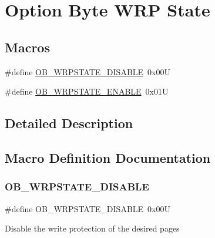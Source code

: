 \hypertarget{group___f_l_a_s_h_ex___o_b___w_r_p___state}{}\section{Option Byte W\+RP State}
\label{group___f_l_a_s_h_ex___o_b___w_r_p___state}
\subsection*{Macros}
\begin{DoxyCompactItemize}
\item 
\#define \hyperlink{group___f_l_a_s_h_ex___o_b___w_r_p___state_gaa34eb6205fe554f65a311ee974d5a4ab}{O\+B\+\_\+\+W\+R\+P\+S\+T\+A\+T\+E\+\_\+\+D\+I\+S\+A\+B\+LE}~0x00U
\item 
\#define \hyperlink{group___f_l_a_s_h_ex___o_b___w_r_p___state_ga9fc463145ab57616baa36d95523186a1}{O\+B\+\_\+\+W\+R\+P\+S\+T\+A\+T\+E\+\_\+\+E\+N\+A\+B\+LE}~0x01U
\end{DoxyCompactItemize}


\subsection{Detailed Description}


\subsection{Macro Definition Documentation}
\mbox{\label{group___f_l_a_s_h_ex___o_b___w_r_p___state_gaa34eb6205fe554f65a311ee974d5a4ab}} 
\subsubsection{\texorpdfstring{O\+B\+\_\+\+W\+R\+P\+S\+T\+A\+T\+E\+\_\+\+D\+I\+S\+A\+B\+LE}{OB\_WRPSTATE\_DISABLE}}
{\footnotesize\ttfamily \#define O\+B\+\_\+\+W\+R\+P\+S\+T\+A\+T\+E\+\_\+\+D\+I\+S\+A\+B\+LE~0x00U}

Disable the write protection of the desired pages 


